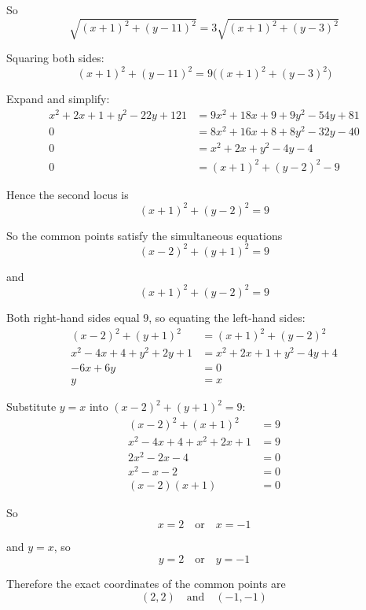 \documentclass[leqno]{article}
\begin{document}
\begin{enumerate}[
  label=\textbf{\arabic*.},
  leftmargin=*,
  topsep=0pt,
  partopsep=0pt,
  parsep=0pt
]
\begin{djsSolution}
So
\[
\sqrt{(x+1)^2+(y-11)^2}=3\sqrt{(x+1)^2+(y-3)^2}
\]

Squaring both sides:
\[
(x+1)^2+(y-11)^2=9\bigl((x+1)^2+(y-3)^2\bigr)
\]

Expand and simplify:
\begin{align*}
x^2+2x+1+y^2-22y+121 &= 9x^2+18x+9+9y^2-54y+81 \\
0 &= 8x^2+16x+8+8y^2-32y-40 \\
0 &= x^2+2x+y^2-4y-4 \\
0 &= (x+1)^2+(y-2)^2-9
\end{align*}

Hence the second locus is
\[
(x+1)^2+(y-2)^2=9
\]

So the common points satisfy the simultaneous equations
\[
(x-2)^2+(y+1)^2=9
\]

and
\[
(x+1)^2+(y-2)^2=9
\]

Both right-hand sides equal \(9\), so equating the left-hand sides:
\begin{align*}
(x-2)^2+(y+1)^2 &= (x+1)^2+(y-2)^2 \\
x^2-4x+4+y^2+2y+1 &= x^2+2x+1+y^2-4y+4 \\
-6x+6y &= 0 \\
y&=x
\end{align*}

Substitute \(y=x\) into \((x-2)^2+(y+1)^2=9\):
\begin{align*}
(x-2)^2+(x+1)^2 &= 9 \\
x^2-4x+4+x^2+2x+1 &= 9 \\
2x^2-2x-4 &= 0 \\
x^2-x-2 &= 0 \\
(x-2)(x+1) &= 0
\end{align*}

So
\[
x=2 \quad \text{or} \quad x=-1
\]

and \(y=x\), so
\[
y=2 \quad \text{or} \quad y=-1
\]

Therefore the exact coordinates of the common points are
\[
(2,2)\quad \text{and}\quad (-1,-1)
\]
\end{djsSolution}


\newpage

\questionitem

\begin{figure}[H]
    \centering
{}
\end{figure}



\end{enumerate}
\end{document}
